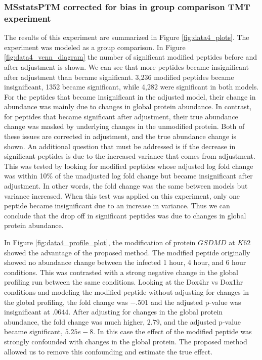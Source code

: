 \documentclass[mcp]{article}
\numberwithin{table}{section}
\begin{document}
\subsubsection*{MSstatsPTM corrected for bias in group comparison TMT experiment}

The results of this experiment are summarized in Figure \ref{fig:data4_plots}. The experiment was modeled as a group comparison. In Figure \ref{fig:data4_venn_diagram} the number of significant modified peptides before and after adjustment is shown. We can see that more peptides became insignificant after adjustment than became significant. 3,236 modified peptides became insignificant, 1352 became significant, while 4,282 were significant in both models. For the peptides that became insignificant in the adjusted model, their change in abundance was mainly due to changes in global protein abundance. In contrast, for peptides that became significant after adjustment, their true abundance change was masked by underlying changes in the unmodified protein. Both of these issues are corrected in adjustment, and the true abundance change is shown. An additional question that must be addressed is if the decrease in significant peptides is due to the increased variance that comes from adjustment. This was tested by looking for modified peptides whose adjusted log fold change was within 10\% of the unadjusted log fold change but became insignificant after adjustment. In other words, the fold change was the same between models but variance increased. When this test was applied on this experiment, only one peptide became insignificant due to an increase in variance. Thus we can conclude that the drop off in significant peptides was due to changes in global protein abundance.

In Figure \ref{fig:data4_profile_plot}, the modification of protein $GSDMD$ at $K62$ showed the advantage of the proposed method. The modified peptide originally showed no abundance change between the infected 1 hour, 4 hour, and 6 hour conditions. This was contrasted with a strong negative change in the global profiling run between the same conditions. Looking at the Dox4hr vs Dox1hr conditions and modeling the modified peptide without adjusting for changes in the global profiling, the fold change was $-.501$ and the adjusted p-value was insignificant at $.0644$. After adjusting for changes in the global protein abundance, the fold change was much higher, $2.79$, and the adjusted p-value became significant, $5.25e-8$. In this case the effect of the modified peptide was strongly confounded with changes in the global protein. The proposed method allowed us to remove this confounding and estimate the true effect.
\end{document}
